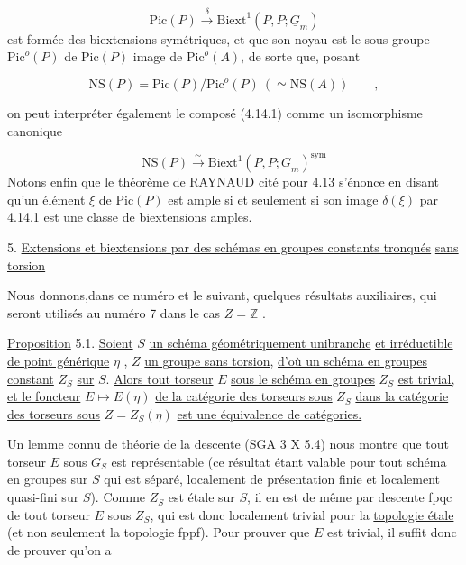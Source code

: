 \begin{equation}\tag{4.14.2}
\mathrm{Pic}(P) \xrightarrow{\ \delta\ } \mathrm{Biext}^{1}(P,P;\underline{G}_{m})
\end{equation}
est formée des biextensions symétriques, et que son noyau est le sous-groupe $\mathrm{Pic}^{o}(P)$ de $\mathrm{Pic}(P)$ image de $\mathrm{Pic}^{o}(A)$, de sorte que, posant

\begin{equation*}
\mathrm{NS}(P) = \mathrm{Pic}(P)/\mathrm{Pic}^{o}(P) \ ( \simeq \mathrm{NS}(A)) \qquad , 
\end{equation*}


 on peut interpréter également le composé (4.14.1) comme un isomorphisme canonique

\begin{equation}\tag{4.14.3}
\mathrm{NS}(P) \stackrel{\sim}{\longrightarrow} \mathrm{Biext}^1(P,P;\underline{G}_m)^{\mathrm{sym}}
\end{equation}
Notons enfin que le théorème de RAYNAUD cité pour 4.13 s'énonce en disant qu'un élément $\xi$ de $\mathrm{Pic}(P)$ est ample si et seulement si son image $\delta(\xi)$ par 4.14.1 est une classe de biextensions amples.


5. \underline{Extensions et biextensions par des schémas en groupes constants tronqués} \underline{sans torsion}

Nous donnons,dans ce numéro et le suivant, quelques résultats auxiliaires, qui seront utilisés au numéro 7 dans le cas $Z = \mathbb{Z}$ .

\underline{Proposition} 5.1. \underline{Soient} $S$ \underline{un schéma géométriquement unibranche} \underline{et irréductible de point générique} $\eta$ , $Z$ \underline{un groupe sans torsion,} \underline{d'où un schéma en groupes constant} $Z_S$ \underline{sur} $S$. \underline{Alors tout torseur} $E$ \underline{sous le schéma en groupes} $Z_S$ \underline{est trivial,} \underline{et le foncteur} $E \longmapsto E(\eta)$ \underline{de la catégorie des torseurs sous} $Z_S$ \underline{dans la catégorie des torseurs sous} $Z = Z_S(\eta)$ \underline{est une équivalence de catégories.}

Un lemme connu de théorie de la descente (SGA 3 X 5.4) nous montre que tout torseur $E$ sous $G_S$ est représentable (ce résultat étant valable pour tout schéma en groupes sur $S$ qui est séparé, localement de présentation finie et localement quasi-fini sur $S$). Comme $Z_S$ est étale sur $S$, il en est de même par descente fpqc de tout torseur $E$ sous $Z_S$, qui est donc localement trivial pour la \underline{topologie étale} (et non seulement
la topologie fppf). Pour prouver que $E$ est trivial, il suffit donc de prouver qu'on a

